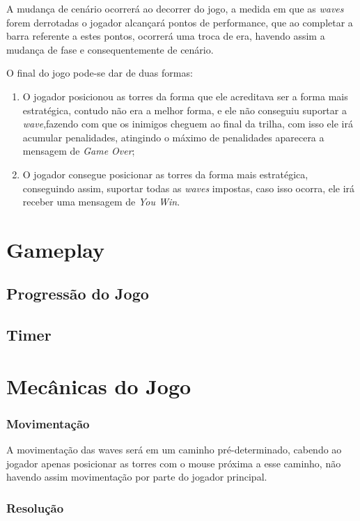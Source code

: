 \documentclass[11pt]{article} %
\begin{document}
A mudança de cenário ocorrerá ao decorrer do jogo, a medida em que as \textit{waves} forem derrotadas o jogador alcançará pontos de performance, que ao completar a barra referente a estes pontos, ocorrerá uma troca de era, havendo assim a mudança de fase e consequentemente de cenário. 

O final do jogo pode-se dar de duas formas:

\begin{enumerate}
\item O jogador posicionou as torres da forma que ele acreditava ser a forma mais estratégica, contudo não era a melhor forma, e ele não conseguiu suportar a \textit{wave},fazendo com que os inimigos cheguem ao final da trilha, com isso ele irá acumular penalidades, atingindo o máximo de penalidades aparecera a mensagem de \textit{Game Over};
\item O jogador consegue posicionar as torres da forma mais estratégica, conseguindo assim, suportar todas as \textit{waves} impostas, caso isso ocorra, ele irá receber uma mensagem de \textit{You Win}.

\end{enumerate}

\section{Gameplay}

\subsection{Progressão do Jogo}

\subsection{Timer}

\newpage

\section{Mecânicas do Jogo}
\subsubsection{Movimentação}
A movimentação das waves será em um caminho pré-determinado, cabendo ao jogador apenas posicionar as torres com o mouse próxima a esse caminho, não havendo assim movimentação por parte do jogador principal.

\subsubsection{Resolução}
\newpage
\end{document}
